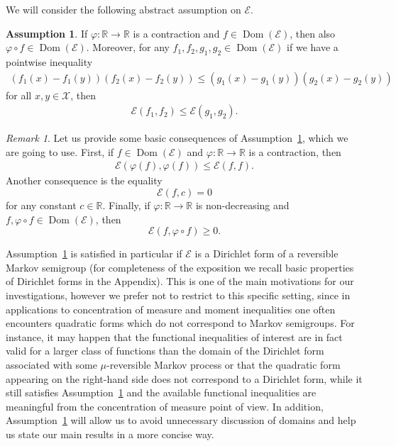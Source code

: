 \documentclass[a4paper]{amsart}
\theoremstyle{definition}
\newtheorem{assumption}{Assumption} %
\theoremstyle{remark}
\newtheorem{remark}[theorem]{Remark}
\numberwithin{equation}{section}
\newcommand*{\RR}{\mathbb{R}}
\newcommand{\calX}{\mathcal{X}}
\DeclareMathOperator{\Dom}{Dom} %
\newcommand*{\calE}{\mathcal{E}}
\begin{document}
We will consider the following abstract assumption on $\mathcal{E}$.
\begin{assumption}
\label{a:I}
\leavevmode
If $\varphi \colon \RR \to \RR$ is a contraction and $f \in \Dom(\calE)$, then also $\varphi\circ f \in \Dom(\calE)$. Moreover, for any $f_1,f_2,g_1,g_2 \in \Dom(\calE)$ if we have a pointwise inequality
\begin{align}\label{eq:assumption-1-2}
(f_1(x) - f_1(y))(f_2(x) - f_2(y)) \le (g_1(x) - g_1(y))(g_2(x) - g_2(y))
\end{align}
for all $x,y \in \calX$, then
\begin{align}\label{eq:assumption-1-3}
  \calE(f_1,f_2) \le \calE(g_1,g_2).
\end{align}
\end{assumption}

\begin{remark} Let us provide some basic consequences of Assumption~\ref{a:I}, which we are going to use.
First, if $f\in \Dom(\calE)$ and $\varphi\colon \RR\to \RR$ is a contraction, then
\begin{align}\label{eq:assumption-1-1}
 \calE(\varphi(f),\varphi(f)) \le \calE(f,f).
\end{align}
Another consequence is the equality
\begin{displaymath}
  \calE(f,c) = 0
\end{displaymath}
for any constant $c \in \RR$. Finally, if $\varphi\colon \RR\to \RR$ is non-decreasing and $f,\varphi\circ f \in \Dom(\calE)$, then
\begin{displaymath}
  \calE(f,\varphi\circ f) \ge 0.
\end{displaymath}
\end{remark}


Assumption~\ref{a:I} is satisfied in particular if $\mathcal{E}$ is a Dirichlet form of a reversible Markov semigroup (for completeness of the exposition we recall basic properties of Dirichlet forms in the Appendix). This is one of the main motivations for our investigations, however we prefer not to restrict to this specific setting, since in applications to concentration of measure and moment inequalities one often encounters quadratic forms which do not correspond to Markov semigroups. For instance, it may happen that the functional inequalities of interest are in fact valid for a larger class of functions than the domain of the Dirichlet form associated with some $\mu$-reversible Markov process or that the quadratic form appearing on the right-hand side does not correspond to a Dirichlet form, while it still satisfies  Assumption~\ref{a:I} and the available functional inequalities are meaningful from the concentration of measure point of view. In addition, Assumption~\ref{a:I} will allow us to avoid unnecessary discussion of domains and help us state our main results in a more concise way.
\end{document}
